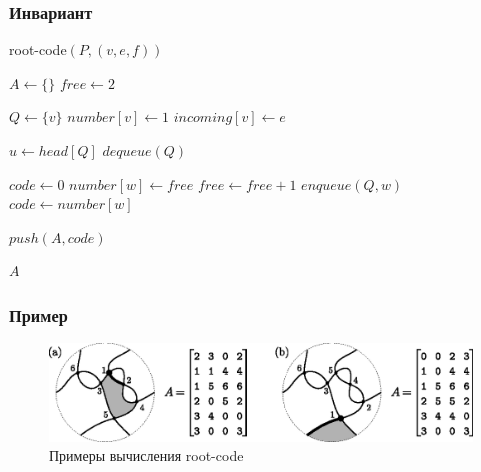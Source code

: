 \documentclass[dvips, intlimits, 9pt, unicode, notheorems]{beamer}
\theoremstyle{plain}
\theoremstyle{definition}
\begin{document}
	\begin{frame}
		\frametitle{Инвариант}

		\begin{block}{root-code$(P, (v, e, f))$}
		{
			\footnotesize
			\begin{algorithmic}[H]
				\STATE $A \leftarrow \{\}$
				\STATE $free \leftarrow 2$

				\STATE $Q \leftarrow \{v\}$
				\STATE $number[v] \leftarrow 1$
				\STATE $incoming[v] \leftarrow e$

					\STATE $u \leftarrow head[Q]$
					\STATE $dequeue(Q)$

							\STATE $code \leftarrow 0$
						\ELSE
								\STATE $number[w] \leftarrow free$
								\STATE $free \leftarrow free + 1$
								\STATE $enqueue(Q, w)$
							\ENDIF
							\STATE $code \leftarrow number[w]$
						\ENDIF

						\STATE $push(A, code)$
					\ENDFOR
				\ENDWHILE

				\RETURN $A$
			\end{algorithmic}
		}
		\end{block}
	\end{frame}

	\begin{frame}
		\frametitle{Пример}

		\begin{figure}[ht]
			\centering
			\includegraphics[scale = 0.7]{c/rcode-example.eps}
			\caption{Примеры вычисления root-code\label{figure:rcode-example}}
		\end{figure}
	\end{frame}
\end{document}
